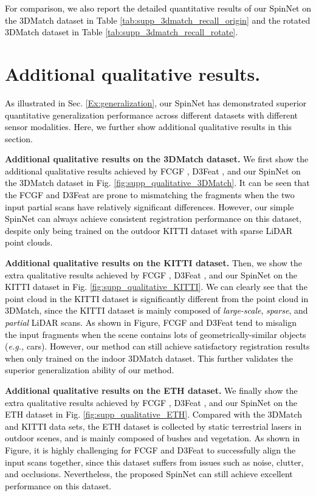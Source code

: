 \documentclass[final]{cvpr}
\newcommand{\nickname}{SpinNet}
\newcommand{\qysupp}[1]{\textcolor{black}{#1}}
\begin{document}
\qysupp{For comparison, we also report the detailed quantitative results of our \nickname{} on the 3DMatch dataset in Table \ref{tab:supp_3dmatch_recall_origin} and the rotated 3DMatch dataset in Table \ref{tab:supp_3dmatch_recall_rotate}.}


\section{Additional qualitative results.}
\qysupp{As illustrated in Sec. \ref{Ex:generalization}, our \nickname{} has demonstrated  superior quantitative generalization performance across different datasets with different sensor modalities. Here, we further show additional qualitative results in this section.}

\smallskip\noindent\textbf{Additional qualitative results on the 3DMatch dataset.} \qysupp{We first show the additional qualitative results achieved by FCGF \cite{choy2019fully}, D3Feat \cite{bai2020d3feat}, and our \nickname{} on the 3DMatch dataset in Fig. \ref{fig:supp_qualitative_3DMatch}. It can be seen that the FCGF and D3Feat are prone to mismatching the fragments when the two input partial scans have relatively significant differences. However, our simple \nickname{} can always achieve consistent registration performance on this dataset, despite only being trained on the outdoor KITTI dataset with sparse LiDAR point clouds.}


\smallskip\noindent\textbf{Additional qualitative results on the KITTI dataset.} \qysupp{Then, we show the extra qualitative results achieved by FCGF \cite{choy2019fully}, D3Feat \cite{bai2020d3feat}, and our \nickname{} on the KITTI dataset in Fig. \ref{fig:supp_qualitative_KITTI}. We can clearly see that the point cloud in the KITTI dataset is significantly different from the point cloud in 3DMatch, since the KITTI dataset is mainly composed of \textit{large-scale}, \textit{sparse}, and \textit{partial} LiDAR scans. As shown in Figure, FCGF and D3Feat tend to misalign the input fragments when the scene contains lots of geometrically-similar objects (\textit{e.g.,} cars). However, our method can still achieve satisfactory registration results when only trained on the indoor 3DMatch dataset. This further validates the superior generalization ability of our method.}

\smallskip\noindent\textbf{Additional qualitative results on the ETH dataset.} \qysupp{We finally show the extra qualitative results achieved by FCGF \cite{choy2019fully}, D3Feat \cite{bai2020d3feat}, and our \nickname{} on the ETH dataset in Fig. \ref{fig:supp_qualitative_ETH}. Compared with the 3DMatch and KITTI data sets, the ETH dataset is collected by static terrestrial lasers in outdoor scenes, and is mainly composed of bushes and vegetation. As shown in Figure, it is highly challenging for FCGF and D3Feat to successfully align the input scans together, since this dataset suffers from issues such as noise, clutter, and occlusions. Nevertheless, the proposed \nickname{} can still achieve excellent performance on this dataset.}
\end{document}
